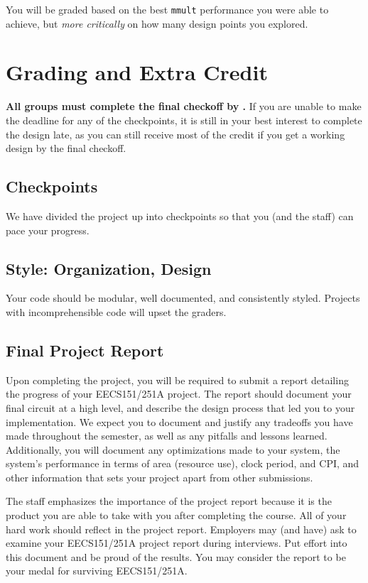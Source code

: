 \documentclass[11pt]{article}
\begin{document}
You will be graded based on the best \verb|mmult| performance you were able to achieve, but \textit{more critically} on how many design points you explored.
\pagebreak

\section{Grading and Extra Credit}
\textbf{All groups must complete the final checkoff by \finalCheckoffDueDate.}
If you are unable to make the deadline for any of the checkpoints, it is still in your best interest to complete the design late, as you can still receive most of the credit if you get a working design by the final checkoff.

\subsection{Checkpoints}
\label{checkoff}
We have divided the project up into checkpoints so that you (and the staff) can pace your progress.

\subsection{Style: Organization, Design}
\label{style}
Your code should be modular, well documented, and consistently styled.
Projects with incomprehensible code will upset the graders.

\subsection{Final Project Report}
Upon completing the project, you will be required to submit a report detailing the progress of your EECS151/251A project.
The report should document your final circuit at a high level, and describe the design process that led you to your implementation.
We expect you to document and justify any tradeoffs you have made throughout the semester, as well as any pitfalls and lessons learned.
Additionally, you will document any optimizations made to your system, the system's performance in terms of area (resource use), clock period, and CPI, and other information that sets your project apart from other submissions.

The staff emphasizes the importance of the project report because it is the product you are able to take with you after completing the course.
All of your hard work should reflect in the project report.
Employers may (and have) ask to examine your EECS151/251A project report during interviews.
Put effort into this document and be proud of the results.
You may consider the report to be your medal for surviving EECS151/251A.
\end{document}
